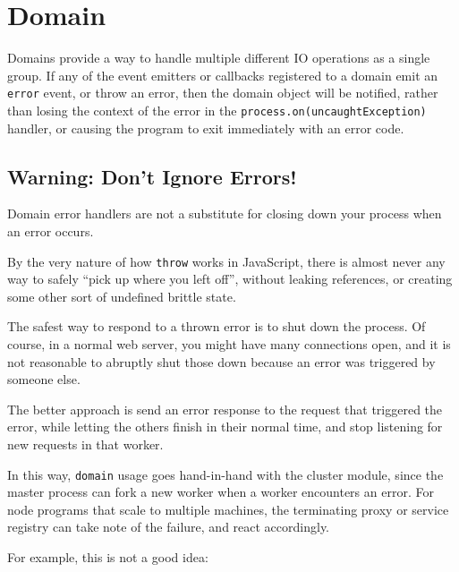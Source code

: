 \section{Domain}\label{domain}

\begin{Shaded}
\begin{Highlighting}[]
 
\end{Highlighting}
\end{Shaded}

Domains provide a way to handle multiple different IO operations as a
single group. If any of the event emitters or callbacks registered to a
domain emit an \texttt{error} event, or throw an error, then the domain
object will be notified, rather than losing the context of the error in
the
\texttt{process.on(\textquotesingle{}uncaughtException\textquotesingle{})}
handler, or causing the program to exit immediately with an error code.

\subsection{Warning: Don't Ignore
Errors!}\label{warning-dont-ignore-errors}

Domain error handlers are not a substitute for closing down your process
when an error occurs.

By the very nature of how \texttt{throw} works in JavaScript, there is
almost never any way to safely ``pick up where you left off'', without
leaking references, or creating some other sort of undefined brittle
state.

The safest way to respond to a thrown error is to shut down the process.
Of course, in a normal web server, you might have many connections open,
and it is not reasonable to abruptly shut those down because an error
was triggered by someone else.

The better approach is send an error response to the request that
triggered the error, while letting the others finish in their normal
time, and stop listening for new requests in that worker.

In this way, \texttt{domain} usage goes hand-in-hand with the cluster
module, since the master process can fork a new worker when a worker
encounters an error. For node programs that scale to multiple machines,
the terminating proxy or service registry can take note of the failure,
and react accordingly.

For example, this is not a good idea:

